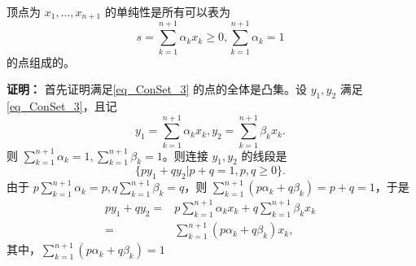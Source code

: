 \begin{theorem}{}
顶点为  $x_1,\ldots,x_{n+1}$ 的单纯性是所有可以表为
\begin{equation}\label{eq_ConSet_3}
s=\sum_{k=1}^{n+1} \alpha_k x_k\geq0,\sum_{k=1}^{n+1}\alpha_k=1~
\end{equation}
的点组成的。
\end{theorem}

\textbf{证明：}
首先证明满足\autoref{eq_ConSet_3} 的点的全体是凸集。设 $y_1,y_2$ 满足\autoref{eq_ConSet_3}，且记
\begin{equation}
y_1=\sum_{k=1}^{n+1} \alpha_k x_k,y_2=\sum_{k=1}^{n+1} \beta_k x_k.~
\end{equation}
则 $\sum_{k=1}^{n+1}\alpha_k=1,\sum_{k=1}^{n+1}\beta_k=1$。则连接 $y_1,y_2$ 的线段是
\begin{equation}
\{py_1+qy_2|p+q=1,p,q\geq0\}.~
\end{equation}
由于 $p\sum_{k=1}^{n+1}\alpha_k=p,q\sum_{k=1}^{n+1}\beta_k=q$，则 $\sum_{k=1}^{n+1}(p\alpha_k +q\beta_k)=p+q=1$，于是
\begin{equation}
\begin{aligned}
py_1+qy_2=&p\sum_{k=1}^{n+1} \alpha_k x_k+q\sum_{k=1}^{n+1} \beta_k x_k\\
=&\sum_{k=1}^{n+1}(p\alpha_k +q\beta_k) x_k,
\end{aligned}~
\end{equation}
其中，$\sum_{k=1}^{n+1}(p\alpha_k +q\beta_k)=1$























